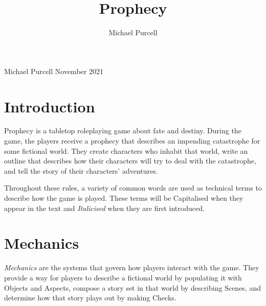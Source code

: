 \documentclass[12pt, a5paper, parskip=half-]{scrartcl}
\title{Prophecy}
\author{Michael Purcell}
\begin{document}
\begin{titlepage}
		\enlargethispage{5\baselineskip}

\setmainfont{Cinzel Decorative}

		
		\setmainfont{URWClassico}

		\vspace{10mm}

		\vfill
		\raggedright{\Large{Michael Purcell \hfill November 2021}}
		\setmainfont{Cinzel Decorative}

\end{titlepage}


%
\setmainfont{URWClassico}
\normalsize
\raggedright
\section*{Introduction}
Prophecy is a tabletop roleplaying game about fate and destiny.
During the game, the players receive a prophecy that describes an impending catastrophe for some fictional world.
They create characters who inhabit that world, write an outline that describes how their characters will try to deal with the catastrophe, and tell the story of their characters' adventures.

Throughout these rules, a variety of common words are used as technical terms to describe how the game is played.
These terms will be Capitalised when they appear in the text and \emph{Italicised} when they are first introduced.

\section*{Mechanics}    
\emph{Mechanics} are the systems that govern how players interact with the game.
They provide a way for players to describe a fictional world by populating it with Objects and Aspects, compose a story set in that world by describing Scenes, and determine how that story plays out by making Checks.
\end{document}
